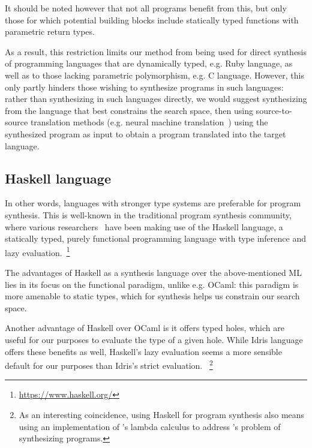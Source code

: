 \documentclass{article}
\begin{document}
It should be noted however that not all programs benefit from this,
but only those for which potential building blocks include statically typed functions with parametric return types.

As a result, this restriction limits our method from being used for direct synthesis of programming languages that are dynamically typed,
e.g. Ruby language, as well as to those lacking parametric polymorphism, e.g. C language.
However, this only partly hinders those wishing to synthesize programs in such languages:
rather than synthesizing in such languages directly, we would suggest synthesizing from the language that best constrains the search space,
then using source-to-source translation methods (e.g. neural machine translation~\citep{kalchbrenner2013recurrent})
using the synthesized program as input to obtain a program translated into the target language.


\subsection{Haskell language}

In other words, languages with stronger type systems are preferable for program synthesis.
This is well-known in the traditional program synthesis community,
where various researchers~\citep{synquid,hornclauses,scythe,gissurarson2018suggesting}
have been making use of the Haskell language,
a statically typed, purely functional programming language with type inference and lazy evaluation.~\footnote{\url{https://www.haskell.org/}}

The advantages of Haskell as a synthesis language over the above-mentioned ML lies in its focus on the functional paradigm,
unlike e.g. OCaml: this paradigm is more amenable to static types, which for synthesis helps us constrain our search space.

Another advantage of Haskell over OCaml is it offers typed holes, which are useful for our purposes to evaluate the type of a given hole.
While Idris language offers these benefits as well, Haskell's lazy evaluation seems a more sensible default for our purposes than Idris's strict evaluation.
~\footnote{As an interesting coincidence, using Haskell for program synthesis also means using an implementation of \citet{lambdacalculus}'s lambda calculus to address \citet{church1957applications}'s problem of synthesizing programs.}
\end{document}
